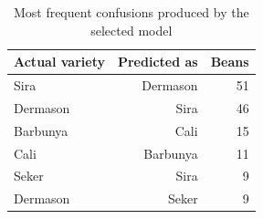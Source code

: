 \begin{table}[htbp]
\centering
\small
\caption{Most frequent confusions produced by the selected model}
\label{tab:confusion_pairs}
\begin{tabular}{lrr}
\toprule
Actual variety & Predicted as & Beans \\
\midrule
Sira & Dermason & 51 \\
Dermason & Sira & 46 \\
Barbunya & Cali & 15 \\
Cali & Barbunya & 11 \\
Seker & Sira & 9 \\
Dermason & Seker & 9 \\
\bottomrule
\end{tabular}
\end{table}
